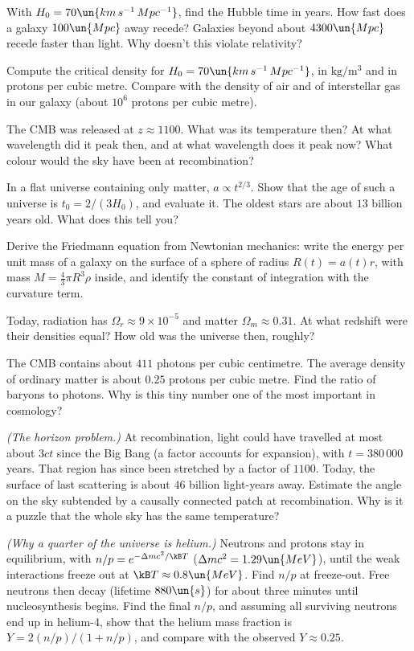 \begin{problems}
\core With $H_0 = 70\un{km\,s^{-1}\,Mpc^{-1}}$, find the Hubble time in years. How fast does a galaxy $100\un{Mpc}$ away recede? Galaxies beyond about $4300\un{Mpc}$ recede faster than light. Why doesn't this violate relativity?

\core \label{prob:critical-density} Compute the critical density for $H_0 = 70\un{km\,s^{-1}\,Mpc^{-1}}$, in $\mathrm{kg/m^3}$ and in protons per cubic metre. Compare with the density of air and of interstellar gas in our galaxy (about $10^6$ protons per cubic metre).

 The CMB was released at $z\approx1100$. What was its temperature then? At what wavelength did it peak then, and at what wavelength does it peak now? What colour would the sky have been at recombination?

\core In a flat universe containing only matter, $a\propto t^{2/3}$. Show that the age of such a universe is $t_0 = 2/(3H_0)$, and evaluate it. The oldest stars are about $13$ billion years old. What does this tell you?

\core \label{prob:friedmann} Derive the Friedmann equation from Newtonian mechanics: write the energy per unit mass of a galaxy on the surface of a sphere of radius $R(t) = a(t)r$, with mass $M = \tfrac43\pi R^3\rho$ inside, and identify the constant of integration with the curvature term.

 Today, radiation has $\Omega_r\approx9\times10^{-5}$ and matter $\Omega_m\approx0.31$. At what redshift were their densities equal? How old was the universe then, roughly?

 The CMB contains about $411$ photons per cubic centimetre. The average density of ordinary matter is about $0.25$ protons per cubic metre. Find the ratio of baryons to photons. Why is this tiny number one of the most important in cosmology?

\core \label{prob:horizon} \emph{(The horizon problem.)} At recombination, light could have travelled at most about $3ct$ since the Big Bang (a factor accounts for expansion), with $t = 380\,000$ years. That region has since been stretched by a factor of $1100$. Today, the surface of last scattering is about $46$ billion light-years away. Estimate the angle on the sky subtended by a causally connected patch at recombination. Why is it a puzzle that the whole sky has the same temperature?

\core \label{prob:helium} \emph{(Why a quarter of the universe is helium.)} Neutrons and protons stay in equilibrium, with $n/p = e^{-\Delta mc^2/\kB T}$ ($\Delta mc^2 = 1.29\un{MeV}$), until the weak interactions freeze out at $\kB T\approx0.8\un{MeV}$. Find $n/p$ at freeze-out. Free neutrons then decay (lifetime $880\un{s}$) for about three minutes until nucleosynthesis begins. Find the final $n/p$, and assuming all surviving neutrons end up in helium-4, show that the helium mass fraction is $Y = 2(n/p)/(1+n/p)$, and compare with the observed $Y\approx0.25$.


\end{problems}
